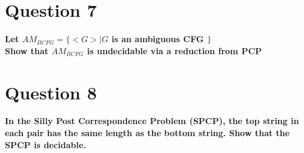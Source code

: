 \documentclass{article}
\begin{document}
\section{Question 7}

\textbf{Let $AM_{BCFG} = \{< G > | G$ is an ambiguous CFG $\}$ \\
    Show that $AM_{BCFG}$ is undecidable via a reduction from PCP\\}

\pagebreak


\section{Question 8}
\textbf{In the Silly Post Correspondence Problem (SPCP), the top string in each pair has the same
length as the bottom string. Show that the SPCP is decidable.\\}

\pagebreak
\end{document}

